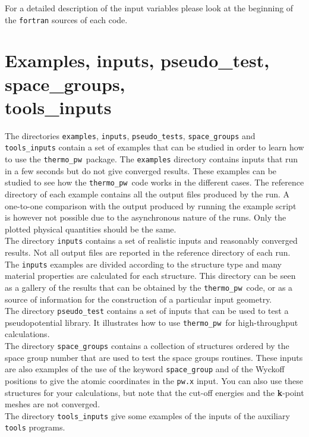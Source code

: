 \documentclass[12pt,a4paper]{article}
\def\thermo{\texttt{thermo\_pw}}
\begin{document}
For a detailed description of the input variables please look at the beginning 
of the \texttt{fortran} sources of each code.

\newpage
\section{\color{coral}Examples, inputs, pseudo\_test, space\_groups,\\ 
tools\_inputs}

The directories \texttt{examples}, \texttt{inputs}, \texttt{pseudo\_tests}, 
\texttt{space\_groups} and \texttt{tools\_inputs} contain a set
of examples that can be studied in order to learn how to use the \thermo\ 
package. The \texttt{examples} directory contains inputs that run in a few
seconds but do not give converged results. These examples can be studied 
to see how the \thermo\ code works in the different cases. The
reference directory of each example contains all the output
files produced by the run. A one-to-one comparison with the output
produced by running the example script is however not possible due to the
asynchronous nature of the runs. Only the plotted physical quantities 
should be the same. \\
The directory \texttt{inputs} contains a set
of realistic inputs and reasonably converged results. Not all
output files are reported in the reference directory of each run.
The \texttt{inputs} examples are divided according to the structure type
and many material properties are calculated for each structure.
This directory can be seen as a gallery of the results that can be
obtained by the \thermo\ code, or as a source of information for the
construction of a particular input geometry. \\
The directory \texttt{pseudo\_test} contains a set of inputs that can
be used to test a pseudopotential library. It illustrates how to use \thermo\ 
for high-throughput calculations. \\
The directory \texttt{space\_groups} contains a collection of structures
ordered by the space group number that are used to test the space
groups routines. These inputs are also examples of the use of the
keyword \texttt{space\_group} and of the Wyckoff positions to give the
atomic coordinates in the \texttt{pw.x} input. You can also use these
structures for your calculations, but note that the cut-off energies and
the {\bf k}-point meshes are not converged. \\
The directory \texttt{tools\_inputs} give some examples of the inputs of
the auxiliary \texttt{tools} programs.
\end{document}
